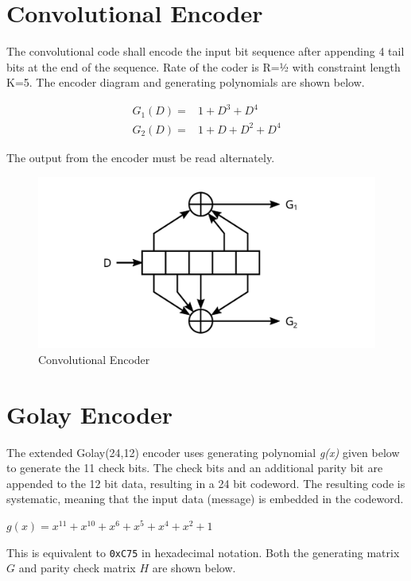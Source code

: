 \documentclass[a4paper,11pt,oneside]{book}
\begin{document}
\chapter{Convolutional Encoder} \label{convolutional_encoder}

The convolutional code shall encode the input bit sequence after
appending 4 tail bits at the end of the sequence. Rate of the coder is
R=½ with constraint length K=5. The encoder diagram and generating
polynomials are shown below.

\begin{align*}
	G_1(D) =& 1 + D^3 + D^4 \\
	G_2(D) =& 1+ D + D^2 + D^4
\end{align*}

The output from the encoder must be read alternately.

\begin{figure}[H]
	\centering
	\includegraphics{img/convolutional}
	\caption{Convolutional Encoder}
	\label{fig:convolutional}
\end{figure}

\chapter{Golay Encoder}

The extended Golay(24,12) encoder uses generating polynomial \emph{g(x)} given below to generate the 11 check bits. The check bits and an additional parity bit are appended to the 12 bit data, resulting in a 24 bit codeword. The resulting code is systematic, meaning that the input data (message) is embedded in the codeword.

$g(x) = x^{11} + x^{10} + x^6 + x^5 + x^4 + x^2 + 1$

This is equivalent to \texttt{0xC75} in hexadecimal notation. Both the generating matrix $G$ and parity check matrix $H$ are shown below.
\end{document}
